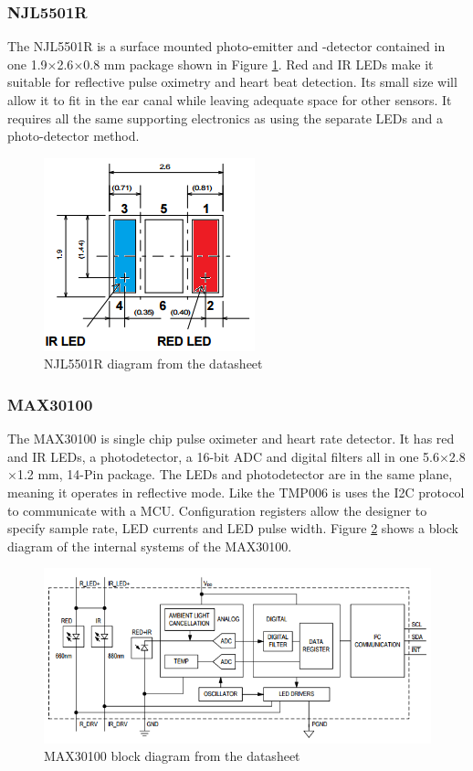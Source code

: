 \subsubsection{NJL5501R}
The NJL5501R is a surface mounted photo-emitter and -detector contained in one 1.9$\times$2.6$\times$0.8 mm package shown in Figure \ref{fig:NJL5501R}. Red and IR LEDs make it suitable for reflective pulse oximetry and heart beat detection. Its small size will allow it to fit in the ear canal while leaving adequate space for other sensors. It requires all the same supporting electronics as using the separate LEDs and a photo-detector method.

 \begin{figure}[h]
   \centering
   \includegraphics[scale=1]{figs/NJL5501R.png}
   \caption{NJL5501R diagram from the datasheet}
   \label{fig:NJL5501R}
\end{figure}

\subsubsection{MAX30100} 
The MAX30100 is single chip pulse oximeter and heart rate detector. It has red and IR LEDs, a photodetector, a 16-bit ADC and digital filters all in one 5.6$\times$2.8$\times$1.2 mm, 14-Pin package. The LEDs and photodetector are in the same plane, meaning it operates in reflective mode. Like the TMP006 is uses the I2C protocol to communicate with a MCU. Configuration registers allow the designer to specify sample rate, LED currents and LED pulse width. Figure \ref{fig:MAX30100_Diagram} shows a block diagram of the internal systems of the MAX30100.

\begin{figure}[H]
   \centering
   \includegraphics[scale=1]{figs/MAX30100_Diagram.png}
   \caption{MAX30100 block diagram from the datasheet}
   \label{fig:MAX30100_Diagram}
\end{figure}

